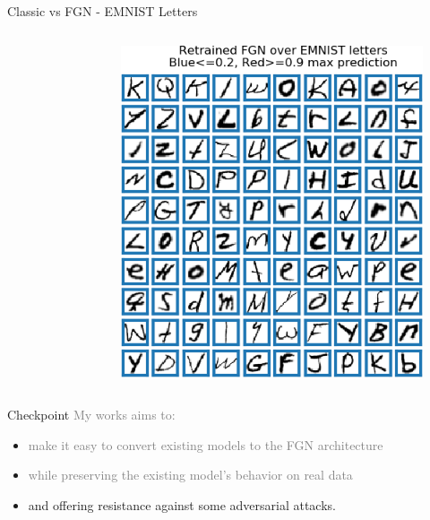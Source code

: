 \documentclass{beamer}
\begin{document}
\begin{frame}{Classic vs FGN - EMNIST Letters}
\begin{columns}
\begin{column}{.33\textwidth}
\begin{figure}
    \end{figure}
    \end{column}
    \begin{column}{.33\textwidth}
    \begin{figure}
        \centering
        \includegraphics[width=.85\textwidth]{images/Letters/retrained-letters.png}
    \end{figure}
    \end{column}
    \end{columns}
    
\end{frame}


\begin{frame}{Checkpoint}
\textcolor{gray}{My works aims to:}
\begin{itemize}
    \item \textcolor{gray}{make it easy to convert existing models to the FGN architecture}
    \item \textcolor{gray}{while preserving the existing model's behavior on real data}
    \item and offering resistance against some adversarial attacks.
\end{itemize}
    
\end{frame}
\end{document}
